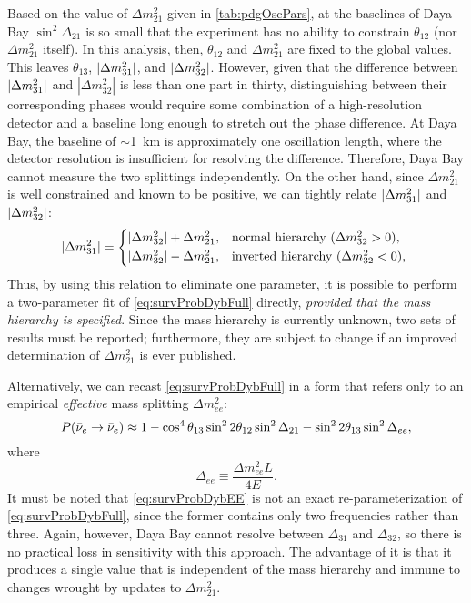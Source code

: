 \documentclass[../thesis.tex]{subfiles}
\begin{document}
Based on the value of $\Delta m^2_{21}$ given in \autoref{tab:pdgOscPars}, at the baselines of Daya Bay \(\sin^2 \Delta_{21}\) is so small that the experiment has no ability to constrain $\theta_{12}$ (nor \(\Delta m^2_{21}\) itself). In this analysis, then, $\theta_{12}$ and $\Delta m^2_{21}$ are fixed to the global values. This leaves $\theta_{13}$, \(\lvert \Delta m^2_{31}\rvert\), and \(\lvert \Delta m^2_{32}\rvert\). However, given that the difference between \(\lvert \Delta m^2_{31}\rvert\) and \(|\Delta m^2_{32}|\) is less than one part in thirty, distinguishing between their corresponding phases would require some combination of a high-resolution detector and a baseline long enough to stretch out the phase difference. At Daya Bay, the baseline of $\sim$1~km is approximately one oscillation length, where the detector resolution is insufficient for resolving the difference. Therefore, Daya Bay cannot measure the two splittings independently. On the other hand, since \(\Delta m^2_{21}\) is well constrained and known to be positive, we can tightly relate \(\lvert \Delta m^2_{31}\rvert\) and \(\lvert \Delta m^2_{32}\rvert\):
\begin{equation}
  \label{eq:hierarchy}
  \abs{\Delta m^2_{31}} =
  \begin{cases*}
    \abs{\Delta m^2_{32}} + \Delta m^2_{21}, & normal hierarchy ($\Delta m^2_{32} > 0$), \\
    \abs{\Delta m^2_{32}} - \Delta m^2_{21}, & inverted hierarchy ($\Delta m^2_{32} < 0$), \\
  \end{cases*}
\end{equation}
Thus, by using this relation to eliminate one parameter, it is possible to perform a two-parameter fit of \autoref{eq:survProbDybFull} directly, \emph{provided that the mass hierarchy is specified}. Since the mass hierarchy is currently unknown, two sets of results must be reported; furthermore, they are subject to change if an improved determination of \(\Delta m^2_{21}\) is ever published.

Alternatively, we can recast \autoref{eq:survProbDybFull} in a form that refers only to an empirical \emph{effective} mass splitting \(\Delta m^2_{ee}\):
\begin{equation}
  \label{eq:survProbDybEE}
  P(\bar\nu_e \rightarrow \bar\nu_e) \approx 1 - \cos^4\theta_{13}\sin^2 2\theta_{12} \sin^2 \Delta_{21}
  - \sin^2 2\theta_{13}\sin^2\Delta_{ee},
\end{equation}
where
\begin{equation}
  \Delta_{ee} \equiv \frac{\Delta m^2_{ee}L}{4E}. 
\end{equation}
It must be noted that \autoref{eq:survProbDybEE} is not an exact re-parameterization of \autoref{eq:survProbDybFull}, since the former contains only two frequencies rather than three. Again, however, Daya Bay cannot resolve between $\Delta_{31}$ and $\Delta_{32}$, so there is no practical loss in sensitivity with this approach. The advantage of it is that it produces a single value that is independent of the mass hierarchy and immune to changes wrought by updates to \(\Delta m^2_{21}\).
\end{document}
